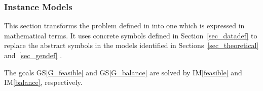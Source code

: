 \documentclass[12pt]{article}
\newcommand{\colAwidth}{0.13\textwidth}
\newcommand{\colBwidth}{0.82\textwidth}
\newcommand{\aref}[1]{A\ref{#1}}
\newcommand{\gsref}[1]{GS\ref{#1}}
\newcounter{instnum} %
\newcommand{\iref}[1]{IM\ref{#1}}
\begin{document}
\subsubsection{Instance Models} \label{sec_instance}

This section transforms the problem defined in  into
one which is expressed in mathematical terms. It uses concrete symbols defined
in Section~\ref{sec_datadef} to replace the abstract symbols in the models
identified in Sections~\ref{sec_theoretical} and~\ref{sec_gendef} .

The goals \gsref{G_feasible} and \gsref{G_balance} are solved by \iref{feasible}
and \iref{balance}, respectively.

~\newline
\end{document}
